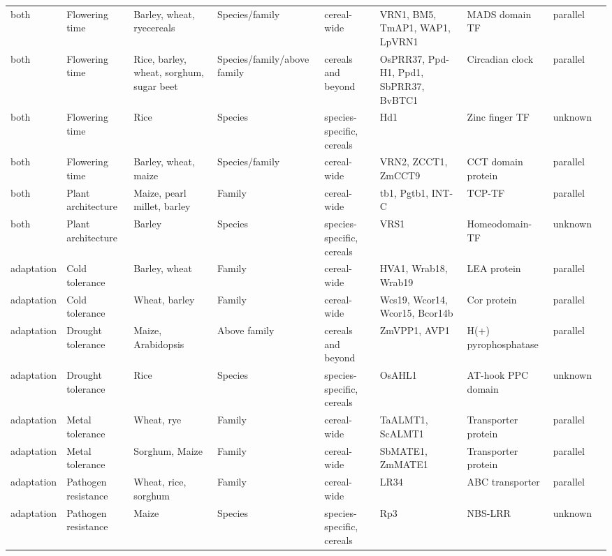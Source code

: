 \documentclass[12pt]{article}
\begin{document}
\begin{table}
\begin{center}
\begin{tabular}{C{1.5cm}G{2.5cm}C{3.10cm}C{3.2cm}C{2.3cm}G{3.5cm}G{2.1cm}C{1.3cm}G{1.5cm}}
 both & Flowering time &Barley, wheat, ryecereals & Species/family & cereal-wide & VRN1, BM5, TmAP1, WAP1, LpVRN1 & MADS domain TF & parallel & \citep{Asp2011}\\
 both & Flowering time &Rice, barley, wheat, sorghum, sugar beet & Species/family/above family & cereals and beyond & OsPRR37, Ppd-H1, Ppd1, SbPRR37, BvBTC1 & Circadian clock& parallel & \citep{MURAKAMI2005, Turner2005, Jones2008, Beales2007, Wilhelm2008, Daz2012}\\
 both & Flowering time &Rice & Species & species-specific, cereals & Hd1 & Zinc finger TF & unknown & \citep{Martin2013}\\
both & Flowering time &Barley, wheat, maize & Species/family & cereal-wide & VRN2, ZCCT1, ZmCCT9 & CCT domain protein& parallel & \citep{Huang2017}\\
 both & Plant architecture &Maize, pearl millet, barley & Family & cereal-wide & tb1, Pgtb1, INT-C & TCP-TF & parallel & \citep{Studer2011, Remigereau2011, Ramsay2011}\\
 both & Plant architecture &Barley & Species & species-specific, cereals & VRS1 & Homeodomain-TF & unknown & \citep{Martin2013}\\
 adaptation & Cold tolerance &Barley, wheat & Family & cereal-wide & HVA1, Wrab18, Wrab19 & LEA protein & parallel & \citep{Hong1988, pmid16755132}\\
 adaptation & Cold tolerance &Wheat, barley & Family & cereal-wide & Wcs19, Wcor14, Wcor15, Bcor14b & Cor protein & parallel & \citep{Takumi2003}\\
 adaptation & Drought tolerance &Maize, Arabidopsis & Above family & cereals and beyond & ZmVPP1, AVP1 & H(+) pyrophosphatase & parallel & \citep{Wang2016}\\
 adaptation & Drought tolerance &Rice & Species & species-specific, cereals & OsAHL1 & AT-hook PPC domain & unknown & \citep{Zhou2016}\\
 adaptation & Metal tolerance &Wheat, rye & Family & cereal-wide & TaALMT1, ScALMT1 & Transporter protein & parallel & \citep{Martin2013}\\
 adaptation & Metal tolerance &Sorghum, Maize & Family & cereal-wide & SbMATE1, ZmMATE1 & Transporter protein & parallel & \citep{Martin2013}\\
 adaptation & Pathogen resistance &Wheat, rice, sorghum & Family & cereal-wide & LR34 & ABC transporter & parallel & \citep{Krattinger2010}\\
 adaptation & Pathogen resistance &Maize & Species & species-specific, cereals & Rp3 & NBS-LRR & unknown & \citep{pmid12242248}\\

\end{tabular}
\end{center}
\end{table}
\end{document}

